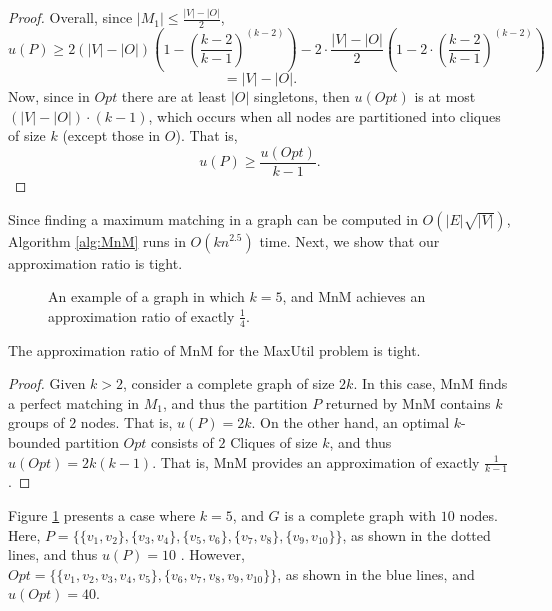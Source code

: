 \documentclass[sigconf,anonymous]{aamas}
\begin{document}
\begin{proof}
Overall, since $|M_1| \leq \frac{|V|-|O|}{2}$, %
\[u(P) \geq 2(|V| - |O|)(1 - (\frac{k-2}{k-1})^{(k-2)}) - 2\cdot\frac{|V|-|O|}{2}(1 - 2 \cdot (\frac{k-2}{k-1})^{(k-2)})\]\[ = %
|V|-|O|.\]
Now, since in $Opt$ there are at least $|O|$ singletons, then $u(Opt)$ is at most $(|V|-|O|)\cdot(k-1)$, which occurs when all nodes are partitioned into cliques of size $k$ (except those in $O$). That is, 
\[ u(P) \geq \frac{u(Opt)}{k-1}.\]
\end{proof}



Since finding a maximum matching in a graph can be computed in $O(|E|\sqrt{|V|})$, Algorithm \ref{alg:MnM} runs in $O(kn^{2.5})$ time.
Next, we show that our approximation ratio is tight. 

\begin{figure}
\centering
{}
\caption{An example of a graph in which $k=5$, and MnM achieves an approximation ratio of exactly $\frac{1}{4}$.}
\label{fig:complete_graph}
\end{figure}

\begin{theorem}
The approximation ratio of MnM for the MaxUtil problem is tight. 
\end{theorem}
\begin{proof}
Given $k>2$, consider a complete graph of size $2k$. In this case, MnM finds a perfect matching in $M_1$, and thus the partition $P$ returned by MnM contains $k$ groups of $2$ nodes. That is, $u(P) = 2k$. On the other hand, an optimal $k$-bounded partition $Opt$ consists of $2$ Cliques of size $k$, and thus $u(Opt) = 2k(k-1)$. That is, MnM provides an approximation of exactly $\frac{1}{k-1}$.
\end{proof}
Figure \ref{fig:complete_graph} presents a case where $k=5$, and $G$ is a complete graph with $10$ nodes. Here, $P=\{\{v_1,v_2\},\{v_3,v_4\},\{v_5,v_6\},\{v_7,v_8\},\{v_9,v_{10}\}\}$, as shown in the dotted lines, and thus $u(P) = 10$ . However, $Opt = \{\{v_1,v_2,v_3,v_4,v_5\}, \{v_6,v_7,v_8,v_9,v_{10}\}\}$, as shown in the blue lines, and $u(Opt) = 40$.
\end{document}
